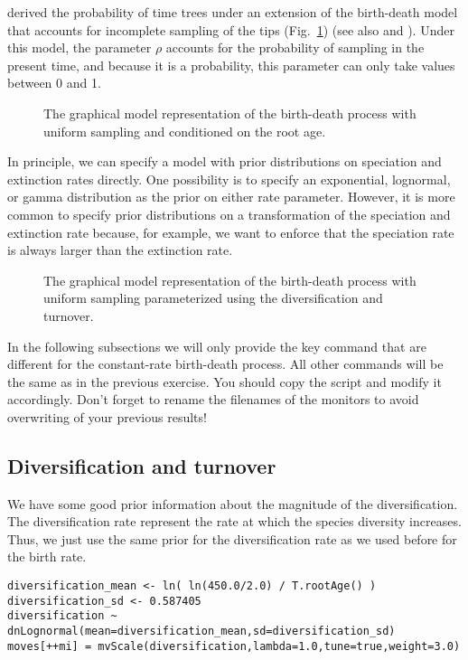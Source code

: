 \citet{Yang1997} derived the probability of time trees under an extension of the birth-death model that accounts for incomplete sampling of the tips (Fig.~\ref{bdrGMFig1}) (see also \cite{Stadler2009} and \cite{Hoehna2014a}). 
Under this model, the parameter $\rho$ accounts for the probability of sampling in the present time, and because it is a probability, this parameter can only take values between 0 and 1. 
\begin{figure}[h!]
\centering
{}
\caption{\small The graphical model representation of the birth-death process with uniform sampling and conditioned on the root age.}
\label{bdrGMFig1}
\end{figure}

In principle, we can specify a model with prior distributions on speciation and extinction rates directly.
One possibility is to specify an exponential, lognormal, or gamma distribution as the prior on either rate parameter.
However, it is more common to specify prior distributions on a transformation of the speciation and extinction rate because, for example, we want to enforce that the speciation rate is always larger than the extinction rate.


\begin{figure}[h!]
\centering
{}
\caption{\small The graphical model representation of the birth-death process with uniform sampling parameterized using the diversification and turnover.}
\label{bdrGMFig2}
\end{figure}

In the following subsections we will only provide the key command that are different for the constant-rate birth-death process.
All other commands will be the same as in the previous exercise.
You should copy the  script and modify it accordingly.
Don't forget to rename the filenames of the monitors to avoid overwriting of your previous results!


\subsection{Diversification and turnover}

We have some good prior information about the magnitude of the diversification.
The diversification rate represent the rate at which the species diversity increases.
Thus, we just use the same prior for the diversification rate as we used before for the birth rate.
{\tt \begin{snugshade*}
\begin{lstlisting}
diversification_mean <- ln( ln(450.0/2.0) / T.rootAge() )
diversification_sd <- 0.587405
diversification ~ dnLognormal(mean=diversification_mean,sd=diversification_sd) 
moves[++mi] = mvScale(diversification,lambda=1.0,tune=true,weight=3.0)
\end{lstlisting}
\end{snugshade*}}

